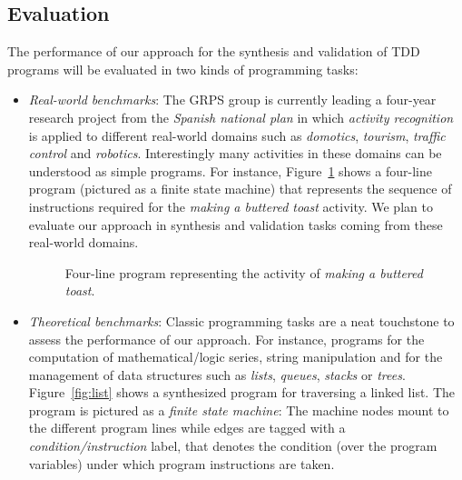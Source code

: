 \documentclass[10pt,a4paper]{paper}
\begin{document}
\subsection{Evaluation}
\label{sec:evaluation}
The performance of our approach for the synthesis and validation of TDD programs will be evaluated in two kinds of programming tasks:
\begin{itemize}
\item {\em Real-world benchmarks}: The GRPS group is currently leading a four-year research project from the {\em Spanish national plan} in which {\em activity recognition} is applied to different real-world domains such as {\em domotics}, {\em tourism}, {\em traffic control} and {\em robotics}. Interestingly many activities in these domains can be understood as simple programs. For instance, Figure~\ref{fig:activity} shows a four-line program (pictured as a finite state machine) that represents the sequence of instructions required for the {\em making a buttered toast} activity. We plan to evaluate our approach in synthesis and validation tasks coming from these real-world domains. 

\begin{figure}[hbt!]
\begin{center}
\end{center}
\caption{\small Four-line program representing the activity of {\em making a buttered toast}.}
\label{fig:activity}
\end{figure}


\item {\em Theoretical benchmarks}: Classic programming tasks are a neat touchstone to assess the performance of our approach. For instance, programs for the computation of mathematical/logic series, string manipulation and for the management of data structures such as {\em lists}, {\em queues}, {\em stacks} or {\em trees}. Figure~\ref{fig:list} shows a synthesized program for traversing a linked list. The program is pictured as a {\em finite state machine}: The machine nodes mount to the different program lines while edges are tagged with a {\em condition/instruction} label, that denotes the condition (over the program variables) under which program instructions are taken.  
\end{itemize}
\end{document}
